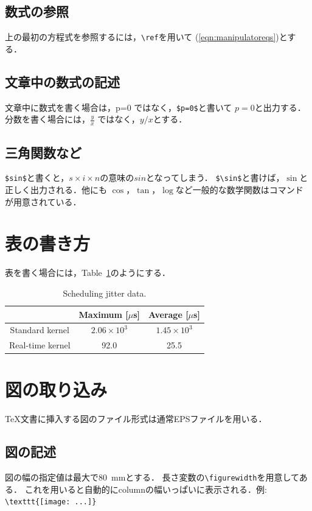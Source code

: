 \documentclass[onecolumn]{jsarticle}
\begin{document}
\subsection{数式の参照}
上の最初の方程式を参照するには，\verb+\ref+を用いて
(\ref{eqn:manipulatoreqs})とする．

\subsection{文章中の数式の記述}
文章中に数式を書く場合は，p=0 ではなく，\verb+$p=0$+と書いて
$p=0$と出力する．
分数を書く場合には，$\frac{y}{x}$ ではなく，$y/x$とする．

\subsection{三角関数など}
\verb+$sin$+と書くと，$s\times i\times n$の意味の$sin$となってしまう．
\verb+$\sin$+と書けば，$\sin$と正しく出力される．他にも
$\cos$，$\tan$，$\log$など一般的な数学関数はコマンドが用意されている．


\section{表の書き方}
表を書く場合には，Table~\ref{table:jitter}のようにする．
\begin{table}[ht]
  \centering
  \caption{Scheduling jitter data.}
  \label{table:jitter}
  \begin{tabular}{|c|c|c|}\hline
    & Maximum [$\mu$s] & Average [$\mu$s] \\ \hline \hline
    Standard kernel & $2.06 \times 10^3$ & $1.45 \times 10^3$ \\ \hline
    Real-time kernel & 92.0 & 25.5 \\ \hline
  \end{tabular}
\end{table}


\section{図の取り込み}
\TeX 文書に挿入する図のファイル形式は通常EPSファイルを用いる．

\subsection{図の記述}
図の幅の指定値は最大で80~mmとする．
長さ変数の\verb+\figurewidth+を用意してある．
これを用いると自動的にcolumnの幅いっぱいに表示される．例:\\
{\small \verb+\texttt{[image: ...]}+}
\end{document}
